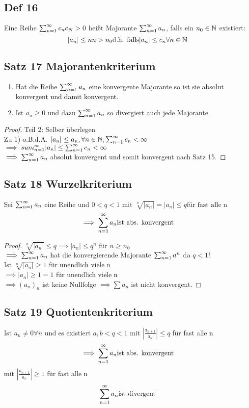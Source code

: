 \subsection{Def 16}
Eine Reihe $ \sum_{n=1}^{\infty} c_n c_N > 0$ heißt Majorante $\sum_{n=1}^{\infty} a_n$, falls ein $n_0 \in \mathbb{N}$ existiert:
$$|a_n| \le n n>n_0 \text{d.h. falls} |a_n| \le c_n \forall n \in \mathbb{N}$$

\subsection{Satz 17 Majorantenkriterium}
\begin{enumerate}
 \item Hat die Reihe $\sum_{n=1}^{\infty} a_n$ eine konvergente Majorante so ist sie absolut konvergent und damit konvergent.
 \item Ist $a_n \ge 0$ und dazu $\sum_{n=1}^{\infty} a_n$ so divergiert auch jede Majorante.
\end{enumerate}

\begin{proof}
Teil 2: Selber überlegen\\
Zu 1) o.B.d.A. $|a_n| \leq a_n, \forall n \in\mathbb{N}, \sum_{n=1}^{\infty} c_n < \infty$\\
$\implies sum_{n=1}^\infty |a_n| \leq \sum_{n=1}^{\infty} c_n < \infty$\\
$\implies \sum_{n=1}^{\infty} a_n$ absolut konvergent und somit konvergent nach Satz 15.
\end{proof}


\subsection{Satz 18 Wurzelkriterium}
Sei $\sum_{n=1}^{\infty} a_n$ eine Reihe und $0 < q < 1$
mit $\sqrt[n]{|a_n|} = | a_n| \le q \text{für fast alle n}$
$$\implies \sum_{n=1}^{\infty} a_n \text{ist abs. konvergent}$$

\begin{proof}
  $\sqrt[n]{|a_n|} \leq q \implies |a_n| \leq q^n$ für $n \geq n_0$\\
  $\implies \sum_{n=1}^{\infty} a_n$ hat die konvergierende Majorante $\sum_{n=1}^{\infty} a^n$ da $q < 1$!\\
  Ist $\sqrt[n]{|a_n|} \geq 1$ für unendlich viele n\\
  $\implies |a_n| \geq 1 = 1$ für unendlich viele n\\
  $\implies (a_n)_n$ ist keine Nullfolge $\implies \sum a_n$ ist nicht konvergent.
\end{proof}

\subsection{Satz 19 Quotientenkriterium}
Ist $a_n \ne 0 \forall n$ und es existiert $a,b < q < 1$
mit $ | \frac{a_{n+1}}{a_n} | \le q $ für fast alle n
$$\implies \sum_{n=1}^{\infty} a_n \text{ist abs. konvergent}$$
mit $ | \frac{a_{n+1}}{a_n} | \ge 1 $ für fast alle n
$$\sum_{n=1}^{\infty} a_n \text{ist divergent}$$

